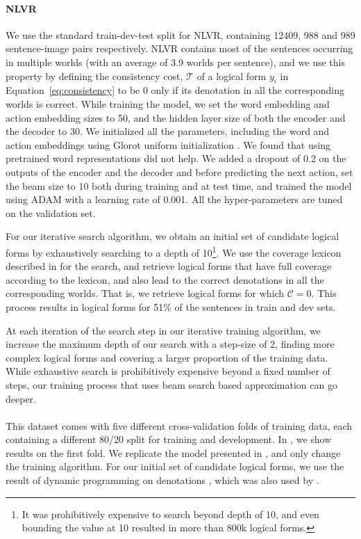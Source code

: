 \paragraph{NLVR} We use the standard train-dev-test split for NLVR, containing 12409, 988 and 989 sentence-image pairs respectively. NLVR contains most of the sentences occurring in multiple worlds (with an average of 3.9 worlds per sentence), and we use this property by defining the consistency cost, $\mathcal{T}$ of a logical form $y_i$ in Equation~\ref{eq:consistency} to be 0 only if its denotation in all the corresponding worlds is correct. While training the model, we set the word embedding and action embedding sizes to 50, and the hidden layer size of both the encoder and the decoder to 30. We initialized all the parameters, including the word and action embeddings using Glorot uniform initialization \citep{glorot2010understanding}. We found that using pretrained word representations did not help. We added a dropout \citep{srivastava2014dropout} of 0.2 on the outputs of the encoder and the decoder and before predicting the next action, set the beam size to 10 both during training and at test time, and trained the model using ADAM \citep{kingma2014adam} with a learning rate of 0.001. All the hyper-parameters are tuned on the validation set. 

For our iterative search algorithm, we obtain an initial set of candidate logical forms by exhaustively searching to a depth of 10\footnote{It was prohibitively expensive to search beyond depth of 10, and even bounding the value at 10 resulted in more than 800k logical forms.}. We use the coverage lexicon described in  for the search, and retrieve logical forms that have full coverage according to the lexicon, and also lead to the correct denotations in all the corresponding worlds. That is, we retrieve logical forms for which $\mathcal{C} = 0$. This process results in logical forms for 51\% of the sentences in train and dev sets.

At each iteration of the search step in our iterative training algorithm, we increase the maximum depth of our search with a step-size of 2, finding more complex logical forms and covering a larger proportion of the training data. While exhaustive search is prohibitively expensive beyond a fixed number of steps, our training process that uses beam search based approximation can go deeper.

\paragraph{\WTQ} This dataset comes with five different cross-validation folds of training data, each containing a different 80/20 split for training and development. In , we show results on the first fold. We replicate the model presented in \citet{krishnamurthy2017neural}, and only change the training algorithm.  For our initial set of candidate logical forms, we use the result of dynamic programming on denotations \cite{pasupat2016inferring}, which was also used by \cite{krishnamurthy2017neural}.


